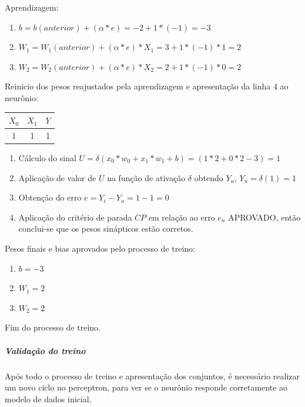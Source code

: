 \documentclass[	12pt, Times, openright, twoside, a4paper, english, brazil]{abntex2}
\begin{document}
            	
            	Aprendizagem:
            	\begin{enumerate}
            		\item $b=b(anterior)+(\alpha*e) = -2 + 1*(-1) = -3 $  					
            		\item $W_1=W_1(anterior) + (\alpha*e)*X_1 = 3 + 1*(-1)*1 = 2$ 
            		\item $W_2=W_2(anterior) + (\alpha*e)*X_2 = 2 + 1*(-1)*0 = 2$
            	\end{enumerate}	
            	
            	Reinicio dos pesos reajustados pela aprendizagem e apresentação da linha 4 ao neurônio:
            	\begin{tabular}{|c|c|c|}
            		\hline  \textbf{$X_0$} & \textbf{$X_1$} &  \textbf{$Y$}\\
            		\hline 1 & 1 & 1\\
            	\end{tabular}
            	
            	\begin{enumerate}
            		\item Cálculo do sinal $U = \delta(x_0*w_0 + x_1*w_1 +b) = (1*2 + 0*2 -3) = 1$
            		\item Aplicação de valor de $U$ na função de ativação $\delta$ obtendo $Y_u$, $Y_u = \delta(1) = 1$
            		\item Obtenção do erro $e = Y_i-Y_u = 1 - 1 = 0$
            		\item Aplicação do critério de parada $CP$ em relação ao erro $e_n$ APROVADO, então conclui-se que os pesos sinápticos estão corretos.
            	\end{enumerate}
            
            	Pesos finais e bias aprovados pelo processo de treino:
            	\begin{enumerate}
            		\item $b=  -3$  					
            		\item $W_1= 2$ 
            		\item $W_2= 2$
            	\end{enumerate}	
            	
            	Fim do processo de treino.
            
            \subparagraph* {Validação do treino}
            	Após todo o processo de treino e apresentação dos conjuntos, é necessário realizar um novo ciclo no perceptron, para ver se o neurônio responde corretamente ao modelo de dados inicial.
            	
\end{document}

